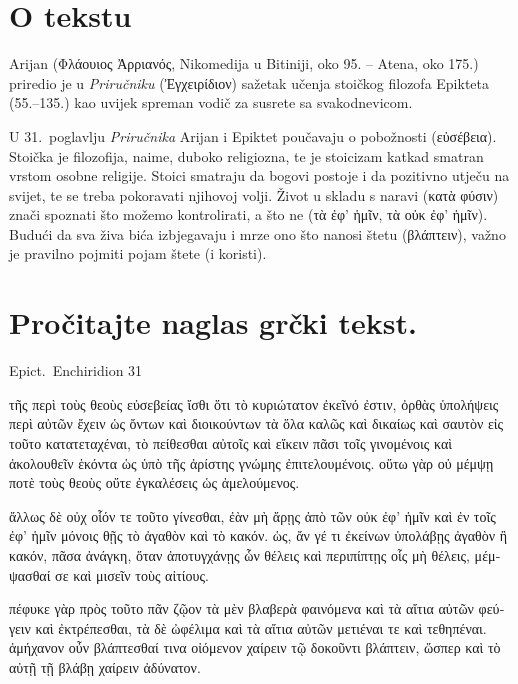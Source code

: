 
\section*{O tekstu}

Arijan \textgreek[variant=ancient]{(Φλάουιος Ἀρριανός,} Nikomedija u Bitiniji, oko 95. – Atena, oko 175.) priredio je u \textit{Priručniku} \textgreek[variant=ancient]{(Ἐγχειρίδιον)} sažetak učenja stoičkog filozofa Epikteta (55.–135.) kao uvijek spreman vodič za susrete sa svakodnevicom.

U 31.\ poglavlju \textit{Priručnika} Arijan i Epiktet poučavaju o pobožnosti \textgreek[variant=ancient]{(εὐσέβεια).} Stoička je filozofija, naime, duboko religiozna, te je stoicizam katkad smatran vrstom osobne religije. Stoici smatraju da bogovi postoje i da pozitivno utječu na svijet, te se treba pokoravati njihovoj volji. Život u skladu s naravi \textgreek[variant=ancient]{(κατὰ φύσιν)} znači spoznati što možemo kontrolirati, a što ne \textgreek[variant=ancient]{(τὰ ἐφ' ἡμῖν, τὰ οὐκ ἐφ' ἡμῖν).} Budući da sva živa bića izbjegavaju i mrze ono što nanosi štetu \textgreek[variant=ancient]{(βλάπτειν),} važno je pravilno pojmiti pojam štete (i koristi).


\section*{Pročitajte naglas grčki tekst.}

Epict.\ Enchiridion 31


\medskip


{\large

\begin{greek}

\noindent τῆς περὶ τοὺς θεοὺς εὐσεβείας ἴσθι ὅτι τὸ κυριώτατον ἐκεῖνό ἐστιν, ὀρθὰς ὑπολήψεις περὶ αὐτῶν ἔχειν ὡς ὄντων καὶ διοικούντων τὰ ὅλα καλῶς καὶ δικαίως καὶ σαυτὸν εἰς τοῦτο κατατεταχέναι, τὸ πείθεσθαι αὐτοῖς καὶ εἴκειν πᾶσι τοῖς γινομένοις καὶ ἀκολουθεῖν ἑκόντα ὡς ὑπὸ τῆς ἀρίστης γνώμης ἐπιτελουμένοις. οὕτω γὰρ οὐ μέμψῃ ποτὲ τοὺς θεοὺς οὔτε ἐγκαλέσεις ὡς ἀμελούμενος.

\noindent ἄλλως δὲ οὐχ οἷόν τε τοῦτο γίνεσθαι, ἐὰν μὴ ἄρῃς ἀπὸ τῶν οὐκ ἐφ' ἡμῖν καὶ ἐν τοῖς ἐφ' ἡμῖν μόνοις θῇς τὸ ἀγαθὸν καὶ τὸ κακόν. ὡς, ἄν γέ τι ἐκείνων ὑπολάβῃς ἀγαθὸν ἢ κακόν, πᾶσα ἀνάγκη, ὅταν ἀποτυγχάνῃς ὧν θέλεις καὶ περιπίπτῃς οἷς μὴ θέλεις, μέμψασθαί σε καὶ μισεῖν τοὺς αἰτίους.

\noindent πέφυκε γὰρ πρὸς τοῦτο πᾶν ζῷον τὰ μὲν βλαβερὰ φαινόμενα καὶ τὰ αἴτια αὐτῶν φεύγειν καὶ ἐκτρέπεσθαι, τὰ δὲ ὠφέλιμα καὶ τὰ αἴτια αὐτῶν μετιέναι τε καὶ τεθηπέναι. ἀμήχανον οὖν βλάπτεσθαί τινα οἰόμενον χαίρειν τῷ δοκοῦντι βλάπτειν, ὥσπερ καὶ τὸ αὐτῇ τῇ βλάβῃ χαίρειν ἀδύνατον.

\end{greek}

}


